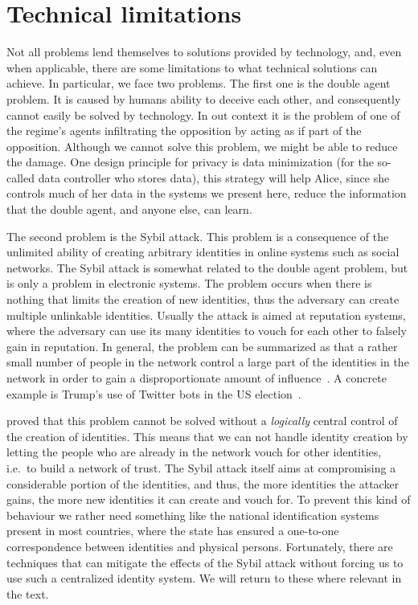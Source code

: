 \section{Technical limitations}
\label{TechnicalLimitations}

Not all problems lend themselves to solutions provided by technology,
and, even when applicable, there are some 
limitations to what technical solutions can achieve.
In particular, we face two problems.
The first one is the double agent problem.
It is caused by humans ability to deceive each other, and consequently cannot 
easily be solved by technology.
\label{DoubleAgentProblem}
In out context it is the problem of one of the regime's agents
infiltrating the opposition by acting as if part of the opposition.
Although we cannot solve this problem, we might be able to reduce the
damage.  One design principle for privacy is data minimization (for
the so-called data controller who stores data), this strategy will
help Alice, since she controls much of her data in the systems we
present here, reduce the information that the double agent, and anyone
else, can learn.

The second problem is the Sybil attack.
This problem is a consequence of the unlimited ability of creating arbitrary 
identities in online systems such as social networks.
\label{SybilAttacks}
The Sybil attack is somewhat related to the double agent problem, but is only 
a problem in electronic systems.
The problem occurs when there is nothing that limits the creation of new 
identities, thus the adversary can create multiple unlinkable identities.
Usually the attack is aimed at reputation systems, where the adversary can use 
its many identities to vouch for each other to falsely gain in reputation.
In general, the problem can be summarized as that a rather small number of 
people in the network control a large part of the identities in the network in 
order to gain a disproportionate amount of influence~\cite{SybilAttack}.
A concrete example is Trump's use of Twitter bots in the US 
election~\cite{BotsAndAutomationDuringUSElection}.

 proved that this problem cannot be solved without 
a \emph{logically} central control of the creation of identities.
This means that we can not handle identity creation by letting the people who 
are already in the network vouch for other identities, i.e.\ to build a network 
of trust.
The Sybil attack itself aims at compromising a considerable portion of the 
identities, and thus, the more identities the attacker gains, the more new 
identities it can create and vouch for.
To prevent this kind of behaviour we rather need something like the national 
identification systems present in most countries, where the state has ensured 
a one-to-one correspondence between identities and physical persons.
Fortunately, there are techniques that can mitigate the effects of the Sybil 
attack without forcing us to use such a centralized identity system.
We will return to these where relevant in the text.
